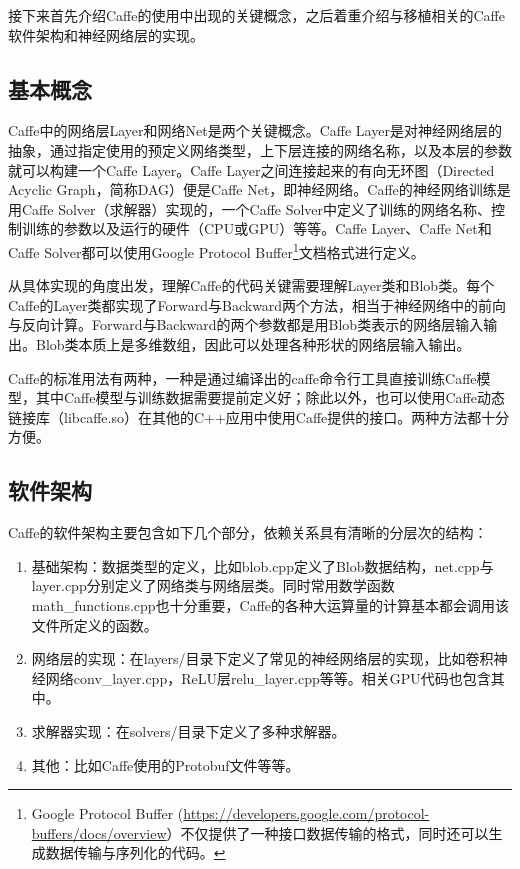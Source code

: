 接下来首先介绍Caffe的使用中出现的关键概念，之后着重介绍与移植相关的Caffe软件架构和神经网络层的实现。

\subsection{基本概念}
Caffe中的网络层Layer和网络Net是两个关键概念。Caffe Layer是对神经网络层的抽象，通过指定使用的预定义网络类型，上下层连接的网络名称，以及本层的参数就可以构建一个Caffe Layer。Caffe Layer之间连接起来的有向无环图（Directed Acyclic Graph，简称DAG）便是Caffe Net，即神经网络。Caffe的神经网络训练是用Caffe Solver（求解器）实现的，一个Caffe Solver中定义了训练的网络名称、控制训练的参数以及运行的硬件（CPU或GPU）等等。Caffe Layer、Caffe Net和Caffe Solver都可以使用Google Protocol Buffer\footnote{Google Protocol Buffer (\url{https://developers.google.com/protocol-buffers/docs/overview}）不仅提供了一种接口数据传输的格式，同时还可以生成数据传输与序列化的代码。}文档格式进行定义。

从具体实现的角度出发，理解Caffe的代码关键需要理解Layer类和Blob类。每个Caffe的Layer类都实现了Forward与Backward两个方法，相当于神经网络中的前向与反向计算。Forward与Backward的两个参数都是用Blob类表示的网络层输入输出。Blob类本质上是多维数组，因此可以处理各种形状的网络层输入输出。

Caffe的标准用法有两种，一种是通过编译出的caffe命令行工具直接训练Caffe模型，其中Caffe模型与训练数据需要提前定义好；除此以外，也可以使用Caffe动态链接库（libcaffe.so）在其他的C++应用中使用Caffe提供的接口。两种方法都十分方便。

\subsection{软件架构}
Caffe的软件架构主要包含如下几个部分，依赖关系具有清晰的分层次的结构：
\begin{enumerate}
\item 基础架构：数据类型的定义，比如blob.cpp定义了Blob数据结构，net.cpp与layer.cpp分别定义了网络类与网络层类。同时常用数学函数math\_functions.cpp也十分重要，Caffe的各种大运算量的计算基本都会调用该文件所定义的函数。
\item 网络层的实现：在layers/目录下定义了常见的神经网络层的实现，比如卷积神经网络conv\_layer.cpp，ReLU层relu\_layer.cpp等等。相关GPU代码也包含其中。
\item 求解器实现：在solvers/目录下定义了多种求解器。
\item 其他：比如Caffe使用的Protobuf文件等等。
\end{enumerate}

